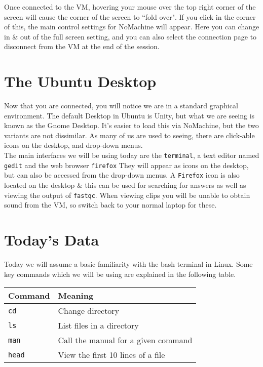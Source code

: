 \begin{information}
Once connected to the VM, hovering your mouse over the top right corner of the screen will cause the corner of the screen to ``fold over".
If you click in the corner of this, the main control settings for NoMachine will appear.
Here you can change in \& out of the full screen setting, and you can also select the connection page to disconnect from the VM at the end of the session.
\end{information}

\section{The Ubuntu Desktop}
\begin{note}
Now that you are connected, you will notice we are in a standard graphical environment.
The default Desktop in Ubuntu is Unity, but what we are seeing is known as the Gnome Desktop.
It's easier to load this via NoMachine, but the two variants are not dissimilar.
As many of us are used to seeing, there are click-able icons on the desktop, and drop-down menus. \\

The main interfaces we will be using today are the \texttt{terminal}, a text editor named \texttt{gedit} and the web browser \texttt{firefox}
They will appear as icons on the desktop, but can also be accessed from the drop-down menus.
A \texttt{Firefox} icon is also located on the desktop \& this can be used for searching for answers as well as viewing the output of \texttt{fastqc}.
When viewing clips  you will be unable to obtain sound from the VM, so switch back to your normal laptop for these.
\end{note}

\section{Today's Data}
\begin{note}
Today we will assume a basic familiarity with the bash terminal in Linux.
Some key commands which we will be using are explained in the following table.
\end{note}
\begin{center}
  \begin{tabular}[h]{|p{3cm} | p{11.5cm} |}
    \hline
    \textbf{Command} & \textbf{Meaning} \\
    \hline
    \texttt{cd} & Change directory \\
    \texttt{ls} & List files in a directory \\
    \texttt{man} & Call the manual for a given command \\
    \texttt{head} & View the first 10 lines of a file \\
    \hline
  \end{tabular}
\end{center}

